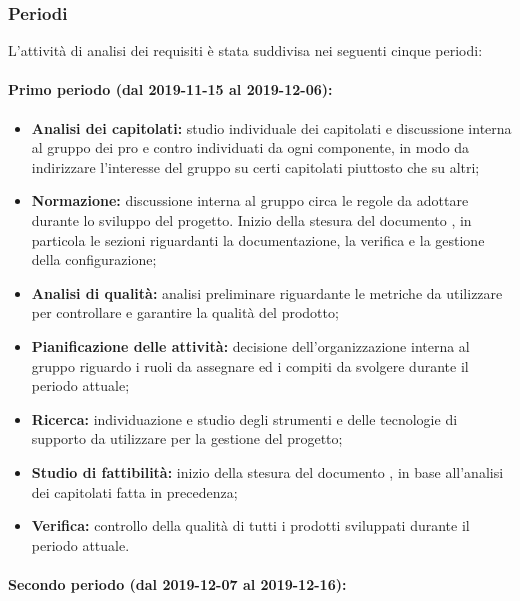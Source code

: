 		\subsubsection{Periodi}
		
			L'attività di analisi dei requisiti è stata suddivisa nei seguenti cinque periodi:
			
			\paragraph{Primo periodo (dal 2019-11-15 al 2019-12-06):}
			
				\begin{itemize}
					\item \textbf{Analisi dei capitolati:} studio individuale dei capitolati e discussione interna al gruppo dei pro e contro individuati da ogni componente, in modo da indirizzare l'interesse del gruppo su certi capitolati piuttosto che su altri;
					\item \textbf{Normazione:} discussione interna al gruppo circa le regole da adottare durante lo sviluppo del progetto. Inizio della stesura del documento , in particola le sezioni riguardanti la documentazione, la verifica e la gestione della configurazione;
					\item \textbf{Analisi di qualità:} analisi preliminare riguardante le metriche da utilizzare per controllare e garantire la qualità del prodotto;
					\item \textbf{Pianificazione delle attività:} decisione dell'organizzazione interna al gruppo riguardo i ruoli da assegnare ed i compiti da svolgere durante il periodo attuale;
					\item \textbf{Ricerca:} individuazione e studio degli strumenti e delle tecnologie di supporto da utilizzare per la gestione del progetto;
					\item \textbf{Studio di fattibilità:} inizio della stesura del documento , in base all'analisi dei capitolati fatta in precedenza;
					\item \textbf{Verifica:} controllo della qualità di tutti i prodotti sviluppati durante il periodo attuale.
				\end{itemize}
			
			\paragraph{Secondo periodo (dal 2019-12-07 al 2019-12-16):}
			

